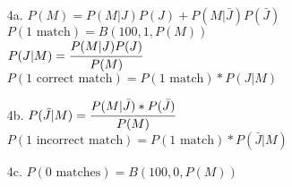 \documentclass{article}
\begin{document}
\begin{itemize}
	\item[4a.] $P(M) = P(M|J)P(J) + P(M|\bar{J})P(\bar{J})$\\
	$P(\text{1 match}) = B(100, 1, P(M))$\\
	$P(J|M) = \cfrac{P(M|J)P(J)}{P(M)}$\\
	$P(\text{1 correct match}) = P(\text{1 match})*P(J|M)$
	\item[4b.] $P(\bar{J}|M) = \cfrac{P(M|\bar{J})*P(\bar{J})}{P(M)}$\\
	$P(\text{1 incorrect match}) = P(\text{1 match})*P(\bar{J}|M)$
	\item[4c.] $P(\text{0 matches}) = B(100, 0, P(M))$
\end{itemize}
\end{document}
